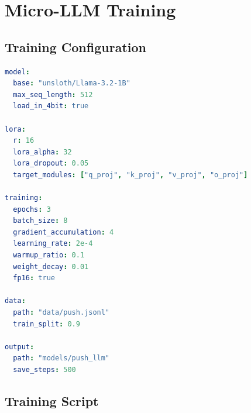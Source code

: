 \documentclass[11pt,a4paper]{article}
\begin{document}
\section{Micro-LLM Training}

\subsection{Training Configuration}

\begin{lstlisting}[language=yaml, caption={configs/push.yaml}]
model:
  base: "unsloth/Llama-3.2-1B"
  max_seq_length: 512
  load_in_4bit: true

lora:
  r: 16
  lora_alpha: 32
  lora_dropout: 0.05
  target_modules: ["q_proj", "k_proj", "v_proj", "o_proj"]

training:
  epochs: 3
  batch_size: 8
  gradient_accumulation: 4
  learning_rate: 2e-4
  warmup_ratio: 0.1
  weight_decay: 0.01
  fp16: true

data:
  path: "data/push.jsonl"
  train_split: 0.9

output:
  path: "models/push_llm"
  save_steps: 500
\end{lstlisting}

\subsection{Training Script}
\end{document}
